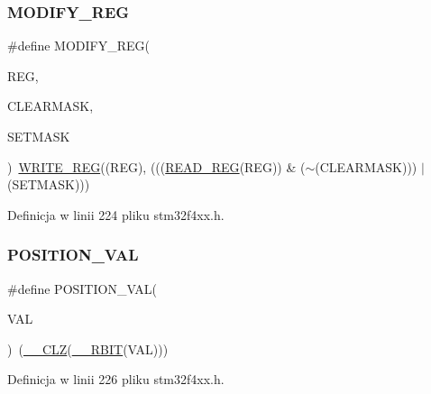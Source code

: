 \subsubsection{\texorpdfstring{M\+O\+D\+I\+F\+Y\+\_\+\+R\+EG}{MODIFY\_REG}}
{\footnotesize\ttfamily \#define M\+O\+D\+I\+F\+Y\+\_\+\+R\+EG(\begin{DoxyParamCaption}\item[{}]{R\+EG,  }\item[{}]{C\+L\+E\+A\+R\+M\+A\+SK,  }\item[{}]{S\+E\+T\+M\+A\+SK }\end{DoxyParamCaption})~\hyperlink{group___exported__macro_ga32f78bffcaf6d13023dcd7f05e0c4d57}{W\+R\+I\+T\+E\+\_\+\+R\+EG}((R\+EG), (((\hyperlink{group___exported__macro_gae7f188a4d26c9e713a48414783421071}{R\+E\+A\+D\+\_\+\+R\+EG}(R\+EG)) \& ($\sim$(C\+L\+E\+A\+R\+M\+A\+SK))) $\vert$ (S\+E\+T\+M\+A\+SK)))}



Definicja w linii 224 pliku stm32f4xx.\+h.

\mbox{\label{group___exported__macro_ga47a8870d71d55cefb3df47cd8c815ec8}} 
\subsubsection{\texorpdfstring{P\+O\+S\+I\+T\+I\+O\+N\+\_\+\+V\+AL}{POSITION\_VAL}}
{\footnotesize\ttfamily \#define P\+O\+S\+I\+T\+I\+O\+N\+\_\+\+V\+AL(\begin{DoxyParamCaption}\item[{}]{V\+AL }\end{DoxyParamCaption})~(\hyperlink{group___c_m_s_i_s___core___instruction_interface_ga5d5bb1527e042be4a9fa5a33f65cc248}{\+\_\+\+\_\+\+C\+LZ}(\hyperlink{group___c_m_s_i_s___core___instruction_interface_gaf944a7b7d8fd70164cca27669316bcf7}{\+\_\+\+\_\+\+R\+B\+IT}(V\+AL)))}



Definicja w linii 226 pliku stm32f4xx.\+h.

\mbox{\label{group___exported__macro_ga822bb1bb9710d5f2fa6396b84e583c33}} 

